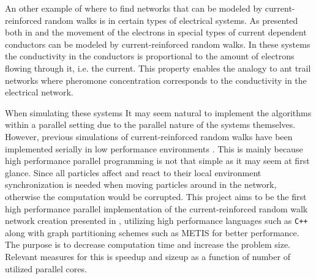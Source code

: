 An other example of where to find networks that can be modeled by current-reinforced random walks is in certain types of electrical systems. As presented both in \cite{Sumpter} and \cite{Doyle} the movement of the electrons in special types of current dependent conductors can be modeled by current-reinforced random walks. In these systems the conductivity in the conductors is proportional to the amount of electrons flowing through it, i.e. the current. This property enables the analogy to ant trail networks where pheromone concentration corresponds to the conductivity in the electrical network.

When simulating these systems It may seem natural to implement the algorithms within a parallel setting due to the parallel nature of the systems themselves. However, previous simulations of current-reinforced random walks have been implemented serially in low performance environments \cite{Sumpter, Ma2012rib}. This is mainly because high performance parallel programming is not that simple as it may seem at first glance. Since all particles affect and react to their local environment synchronization is needed when moving particles around in the network, otherwise the computation would be corrupted. This project aims to be the first high performance parallel implementation of the current-reinforced random walk network creation presented in \cite{Sumpter}, utilizing high performance languages such as \texttt{C++} along with graph partitioning schemes such as METIS for better performance. The purpose is to decrease computation time and increase the problem size. Relevant measures for this is speedup and sizeup as a function of number of utilized parallel cores.